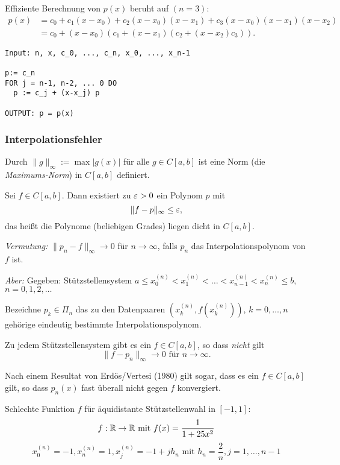 Effiziente Berechnung von $p(x)$ beruht auf $(n=3)$:
\begin{align*}
 p(x) &= c_0 + c_1 (x-x_0) + c_2 (x-x_0)(x-x_1) + c_3 (x-x_0)(x-x_1)(x-x_2) \\
      &= c_0 + (x-x_0) ( c_1 + (x-x_1) ( c_2 + (x-x_2) c_3 ) ).
\end{align*}

\begin{algn}
\begin{lstlisting}
Input: n, x, c_0, ..., c_n, x_0, ..., x_n-1

p:= c_n
FOR j = n-1, n-2, ... 0 DO
  p := c_j + (x-x_j) p
  
OUTPUT: p = p(x)
\end{lstlisting}
\end{algn}

\subsubsection{Interpolationsfehler}
Durch $\| g \|_\infty := \max | g(x) |$ für alle $g \in C[a,b]$ ist eine Norm (die \emph{Maximums-Norm}) in $C[a,b]$ definiert.

\begin{thm}
 Sei $f \in C[a,b]$. Dann existiert zu $\varepsilon > 0$ ein Polynom $p$ mit
 \[ \| f-p \|_\infty \le \varepsilon, \]
 das heißt die Polynome (beliebigen Grades) liegen dicht in $C[a,b]$.
\end{thm}

\emph{Vermutung:} $\| p_n - f \|_\infty \to 0$ für $n \to \infty$, falls $p_n$ das Interpolationspolynom von $f$ ist. 

\emph{Aber:} Gegeben: Stützstellensystem $a \le x_0^{(n)} < x_1^{(n)} < \ldots < x_{n-1}^{(n)} < x_n^{(n)} \le b$, $n = 0, 1, 2, \ldots$

Bezeichne $p_k \in \Pi_n$ das zu den Datenpaaren $(x_k^{(n)}, f(x_k^{(n)}))$, $k = 0, \ldots, n$ gehörige eindeutig bestimmte Interpolationspolynom.

\begin{thm}
 Zu jedem Stützstellensystem gibt es ein $f \in C[a,b]$, so dass \emph{nicht} gilt
 \[ \| f-p_n \|_\infty \to 0 \text{ für } n \to \infty. \]
\end{thm}

Nach einem Resultat von Erdös/Vertesi (1980) gilt sogar, dass es ein $f \in C[a,b]$ gilt, so dass $p_n(x)$ fast überall nicht gegen $f$ konvergiert.

\begin{exmp}[Runge]
 Schlechte Funktion $f$ für äquidistante Stützstellenwahl in $[-1,1]$:
 \[ f: \mathbb{R} \to \mathbb{R} \text{ mit } f(x) = \frac{1}{1 + 25 x^2} \]
 \[ x_0^{(n)} = -1, x_n^{(n)} = 1, x_j^{(n)} = -1 + j h_n \text{ mit } h_n = \frac{2}{n}, j = 1, \ldots, n-1 \]
\end{exmp}

